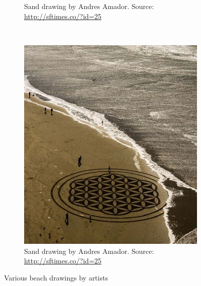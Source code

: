 \begin{figure}
\begin{subfigure}[b]{0.46\textwidth}
\caption{Sand drawing by Andres Amador. Source: \url{http://sftimes.co/?id=25}}
\end{subfigure}
~
\begin{subfigure}[b]{0.46\textwidth}
\includegraphics[width=\textwidth]{images/requirements_inspiration/andres_armador_2.jpg} 
\caption{Sand drawing by Andres Amador. Source: \url{http://sftimes.co/?id=25}}
\end{subfigure}
\caption{Various beach drawings by artists}
\label{fig:sandart_inspiration}
\end{figure}
